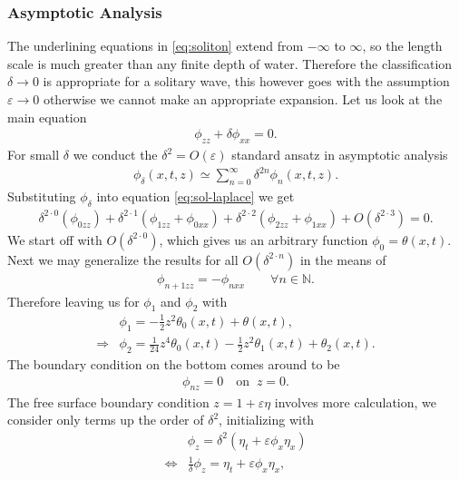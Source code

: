 \subsubsection{Asymptotic Analysis}
The underlining equations in \ref{eq:soliton} extend from $-\infty$ to
$\infty$, so the length scale is much greater than any finite depth of
water. Therefore the classification $\delta \rightarrow 0$ is appropriate for
a solitary wave, this however goes with the assumption
$\varepsilon\rightarrow 0$ otherwise we cannot make an appropriate expansion.
Let us look at the main equation
\begin{align}\label{eq:sol-laplace}
    \phi_{zz} + \delta \phi_{x x} = 0.
\end{align}
For small $\delta$ we conduct the $\delta^2 = O(\varepsilon)$ standard ansatz
in asymptotic analysis
\begin{align}
    \phi_{\delta}(x, t, z) \simeq \sum_{n=0}^{\infty} \delta^{2n}\phi_n(x, t,
    z).
\end{align}
Substituting $\phi_\delta$ into equation \ref{eq:sol-laplace} we get
\begin{align}
    \delta^{2\cdot 0}\left( \phi_{0zz} \right)  + \delta^{2\cdot 1}\left(
    \phi_{1zz}+\phi_{0 x x} \right)  + \delta^{2\cdot 2}\left( \phi_{2zz}+
    \phi_{1 x x} \right)  + O(\delta^{2\cdot 3}) = 0.
\end{align}
We start off with $O(\delta^{2\cdot0}) $, which gives us an arbitrary function
$\phi_{0} = \theta(x, t)$. Next we may generalize the results for all
$O(\delta^{2\cdot n})$ in the means of
\begin{align}
    \phi_{n+1zz}  = -\phi_{nx x}\qquad \forall n\in \mathbb{N} .
\end{align}
Therefore leaving us for $\phi_1$ and $\phi_2$ with
\begin{align}
    &\phi_1 = -\frac{1}{2} z^2 \theta_0(x,t) + \theta(x, t),\\
    \Rightarrow& \phi_2 =
    \frac{1}{24}z^4\theta_0(x,t)-\frac{1}{2}z^2\theta_1(x,t) + \theta_2(x,t).
\end{align}
The boundary condition on the bottom comes around to be
\begin{align}
    \phi_{nz} =0 \quad \text{on}\;\; z=0.
\end{align}
The free surface boundary condition $z= 1+\varepsilon\eta$ involves more calculation, we consider
only terms up the order of $\delta^2$, initializing with
\begin{align}
    &\phi_z = \delta^2(\eta_t + \varepsilon\phi_x \eta_x)\\
    \Leftrightarrow &\frac{1}{\delta}\phi_z = \eta_t + \varepsilon\phi_x
    \eta_x,
\end{align}
